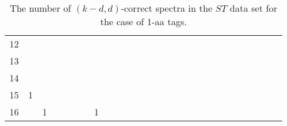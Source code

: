 \begin{landscape}
\begin{table}[h]
{\begin{tabular}{|c|c|
c|c|c|c|c|c|c|c|c|c|c|c|c|c|c|c|c|c|c|c|c|c|c|c|c|}
12  &  &  &  &  &  &  &  &  &  &  &  &  &  &  &  &  &  &  &  &  &  &  &  &  &  & \\

13  &  &  &  &  &  &  &  &  &  &  &  &  &  &  &  &  &  &  &  &  &  &  &  &  &  & \\

14  &  &  &  &  &  &  &  &  &  &  &  &  &  &  &  &  &  &  &  &  &  &  &  &  &  & \\

15  & 1 &  &  &  &  &  &  &  &  &  &  &  &  &  &  &  &  &  &  &  &  &  &  &  &  & \\

16  &  & 1 &  &  &  &  & 1 &  &  &  &  &  &  &  &  &  &  &  &  &  &  &  &  &  &  & \\

  \hline
\end{tabular}
\par}
\centering
\caption{The number of $(k-d,d)$-correct spectra in the $ST$ data set for the case of 1-aa tags.}
\vspace{3mm}
\label{table:kd-1-correct-ST}
\end{table}
\end{landscape}
